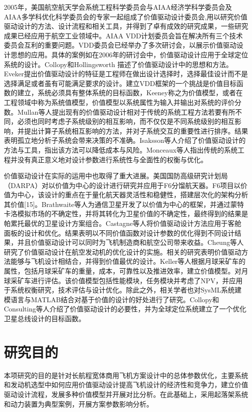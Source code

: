 \documentclass[12pt,a4paper]{report}
\begin{document}
2005年，美国航空航天学会系统工程科学委员会与AIAA经济学科学委员会及AIAA多学科优化科学委员会的专家一起组成了价值驱动设计委员会,用以研究价值驱动设计的方法、设计流程和相关工具，并得到了卓有成效的研究成果，一些研究成果已经应用于航空工业领域中。AIAA VDD计划委员会旨在解决所有三个技术委员会互利的重要问题。VDD委员会已经举办了多次研讨会，以展示价值驱动设计思想的应用。具体的案例如在2006年的研讨会中，价值驱动设计应用于全球定位系统的设计。Collopy和Hollingsworth 描述了价值驱动设计中的思想和方法。Eveker提出价值驱动设计的特征是工程师在做出设计选择时，选择最佳设计而不是选择满足或者虽有可能满足要求的设计。建立VDD框架的一个挑战是价值目标函数的建立，系统必须具有整体系统的目标函数，Keeney称之为价值模型，或者在工程领域中称为系统值模型，价值模型以系统属性为输入并输出对系统的评价分数。Mullan等人提出现有的价值驱动设计相对于传统的系统工程方法若要有所不同，必须也同时考虑子系统级别的相互影响，而不仅仅是不同系统级别的相互影响，并提出计算子系统相互影响的方法，并对子系统交互的重要性进行排序。结果表明孤立地分析子系统会带来决策的不准确。Isaksson等人介绍了价值驱动设计的方法与工具，指出该方法可以降低成本与风险。Monceaux等人指出传统的系统工程并没有真正意义地对设计参数进行系统性与全面性的权衡与优化。

价值驱动设计在实际的运用中也取得了重大进展。美国国防高级研究计划局（DARPA）对以价值为中心的设计进行研究并应用于F6分馏航天器。F6项目以价值为中心，该设计的重点在于量化航天器灵活性和稳健性，搭建层次化的架构分析其价值[15]。Brathwaite等人为通信卫星开发了以价值为中心的框架，并通过蒙特卡洛模拟市场的不确定性，并将其转化为卫星价值的不确定性，最终得到的结果是帕累托最优的卫星设计方案组合。Castagne等人将价值驱动设计方法应用于客舱面板的设计和优化。结果表明以不同价值函数对设计参数的优化得到不同设计结果，并且价值驱动设计可以同时为飞机制造商和航空公司带来收益。Cheung等人研究了价值驱动设计在航空发动机的优化设计的实施。相关的研究表明价值驱动方法能够与飞机设计相结合，并得到价值最优的设计。Keller等人根据月球采矿车的属性，包括月球采矿车的重量，成本，可靠性以及推进效率，建立价值模型。对月球采矿车进行评估。该价值模型包括性能模块，任务模块并考虑了NPV，并应用于系统权衡研究，技术评估与设计优化。除此之外，相关学者也对SysML系统建模语言与MATLAB结合对基于价值的设计的好处进行了研究。Collopy和Consulting等人介绍了价值驱动设计的必要性，并为全球定位系统建立了一个优化卫星总线设计的目标函数。

\chapter{研究目的}
本项研究的目的是针对长航程宽体商用飞机方案设计中的总体参数优化，主要系统和发动机选型中如何应用价值驱动设计提高飞机设计的经济性和竞争力，建立价值驱动设计流程，发展多种价值模型并开展对比分析。在此基础上，采用起落架系统和动力装置为典型案例，开展方案参数影响分析。
\end{document}

